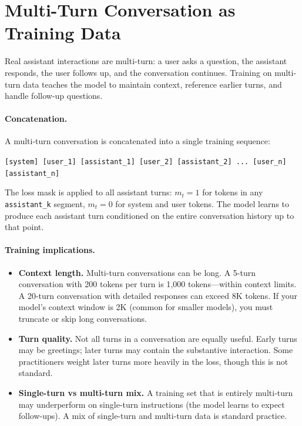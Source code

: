 \section{Multi-Turn Conversation as Training Data}
\label{sec:multi-turn}

Real assistant interactions are multi-turn: a user asks a question, the assistant responds, the user follows up, and the conversation continues. Training on multi-turn data teaches the model to maintain context, reference earlier turns, and handle follow-up questions.

\paragraph{Concatenation.} A multi-turn conversation is concatenated into a single training sequence:

\begin{center}
\small
\texttt{[system] [user\_1] [assistant\_1] [user\_2] [assistant\_2] ... [user\_n] [assistant\_n]}
\end{center}

The loss mask is applied to all assistant turns: $m_t = 1$ for tokens in any \texttt{assistant\_k} segment, $m_t = 0$ for system and user tokens. The model learns to produce each assistant turn conditioned on the entire conversation history up to that point.

\paragraph{Training implications.}

\begin{itemize}[nosep]
  \item \textbf{Context length.} Multi-turn conversations can be long. A 5-turn conversation with 200 tokens per turn is 1{,}000 tokens---within context limits. A 20-turn conversation with detailed responses can exceed 8K tokens. If your model's context window is 2K (common for smaller models), you must truncate or skip long conversations.
  \item \textbf{Turn quality.} Not all turns in a conversation are equally useful. Early turns may be greetings; later turns may contain the substantive interaction. Some practitioners weight later turns more heavily in the loss, though this is not standard.
  \item \textbf{Single-turn vs multi-turn mix.} A training set that is entirely multi-turn may underperform on single-turn instructions (the model learns to expect follow-ups). A mix of single-turn and multi-turn data is standard practice.
\end{itemize}

